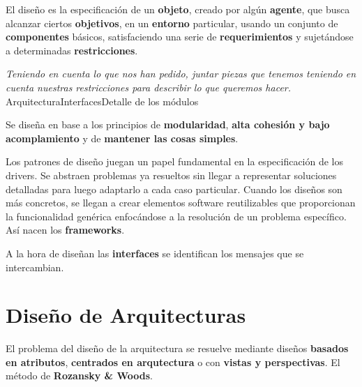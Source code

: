 El diseño es la especificación de un \textbf{objeto}, creado por algún
\textbf{agente}, que busca alcanzar ciertos \textbf{objetivos}, en un
\textbf{entorno} particular, usando un conjunto de
\textbf{componentes} básicos, satisfaciendo una serie de
\textbf{requerimientos} y sujetándose a determinadas
\textbf{restricciones}.

\begin{center}
  \textit{Teniendo en cuenta lo que nos han pedido, juntar piezas que
    tenemos teniendo en cuenta nuestras restricciones para describir lo que queremos
    hacer.}
  Arquitectura\textrightarrow Interfaces\textrightarrow Detalle de los módulos
\end{center}

Se diseña en base a los principios de \textbf{modularidad},
\textbf{alta cohesión y bajo acomplamiento} y de \textbf{mantener las
  cosas simples}.

Los patrones de diseño juegan un papel fundamental en la especificación
de los drivers. Se abstraen problemas ya
resueltos sin llegar a representar soluciones detalladas para luego
adaptarlo a cada caso particular. Cuando los diseños son más
concretos, se llegan a crear elementos software reutilizables que
proporcionan la funcionalidad genérica enfocándose a la resolución de
un problema específico. Así nacen los \textbf{frameworks}.

A la hora de diseñan las \textbf{interfaces} se identifican los
mensajes que se intercambian.

\section{Diseño de Arquitecturas}
\label{sec:arquitectura:diseñoarquitectura}

El problema del diseño de la arquitectura se resuelve mediante diseños
\textbf{basados en atributos}, \textbf{centrados en arqutectura} o con
\textbf{vistas y perspectivas}. El método de \textbf{Rozansky \&
  Woods}.


